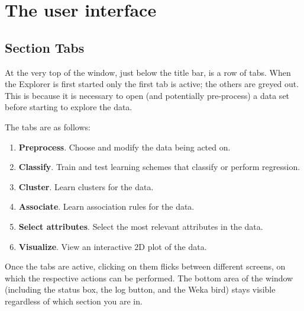 %
%
%
%


\section{The user interface}

\subsection{Section Tabs}

At the very top of the window, just below the title bar, is a row of
tabs. When the Explorer is first started only the first tab is active;
the others are greyed out. This is because it is necessary to open
(and potentially pre-process) a data set before starting to explore
the data.

The tabs are as follows:

\begin{enumerate}
\item \textbf{Preprocess}.
Choose and modify the data being acted on.
\item \textbf{Classify}.
Train and test learning schemes that classify or perform regression.
\item \textbf{Cluster}.
Learn clusters for the data.
\item \textbf{Associate}.
Learn association rules for the data.
\item \textbf{Select attributes}.
Select the most relevant attributes in the data.
\item \textbf{Visualize}.
View an interactive 2D plot of the data.
\end{enumerate}
\noindent
Once the tabs are active, clicking on them flicks between different
screens, on which the respective actions can be performed.  The bottom
area of the window (including the status box, the log button, and the
Weka bird) stays visible regardless of which section you are in.

